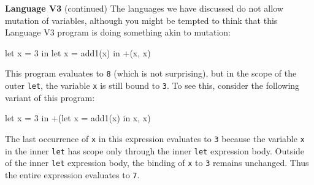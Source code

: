 \begin{minipage}[t]{\sw}
\slidenumber
\LARGE
{\bf Language V3} (continued)\exx
The languages we have discussed do not allow mutation of variables,
although you might be tempted to think that this Language V3 program
is doing something akin to mutation:
\Large
\begin{qv}
let
  x = 3
in
  let
    x = add1(x)
  in
    +(x, x)
\end{qv}
\LARGE
This program evaluates to \verb'8' (which is not surprising),
but in the scope of the outer \verb'let',
the variable \verb'x' is still bound to \verb'3'.
To see this, consider the following variant of this program:
\Large
\begin{qv}
let
  x = 3
in
  +(let x = add1(x) in x, x)
\end{qv}
\LARGE
The last occurrence of \verb'x' in this expression evaluates to \verb'3'
because the variable \verb'x' in the inner \verb'let'
has scope only through the inner \verb'let' expression body.
Outside of the inner \verb'let' expression body,
the binding of \verb'x' to \verb'3' remains unchanged.
Thus the entire expression evaluates to \verb'7'.
\end{minipage}
\clearpage
